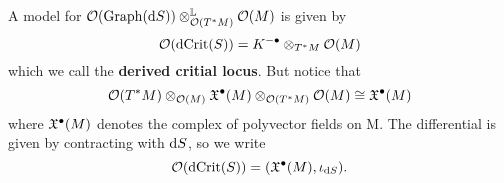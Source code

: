 \begin{example}
\begin{itemize}
\begin{equation*}
    \end{equation*}
    A model for $\mathcal{O}(\operatorname{Graph}(\mathrm{d} S)) \otimes_{\mathcal{O}(T^* M)}^{\mathbb{L}} \mathcal{O}(M)$ is given by
    \begin{equation*}
      \mathcal{O}(\operatorname{dCrit}(S)) = K^{-\bullet} \otimes_{T^* M} \mathcal{O}(M)
    \end{equation*}
    which we call the \textbf{derived critial locus}. But notice that
    \begin{equation*}
      \mathcal{O}(T^* M) \otimes_{\mathcal{O}(M)} \mathfrak{X}^\bullet(M) \otimes_{\mathcal{O}(T^* M)} \mathcal{O}(M) \cong \mathfrak{X}^\bullet(M)
    \end{equation*}
    where $\mathfrak{X}^\bullet(M)$ denotes the complex of polyvector fields on M. The differential is given by contracting with $\mathrm{d} S$, so we write
    \begin{equation*}
      \mathcal{O}(\operatorname{dCrit}(S)) = (\mathfrak{X}^\bullet(M), \iota_{\mathrm{d} S}).
    \end{equation*}
  \end{itemize}
\end{example}

